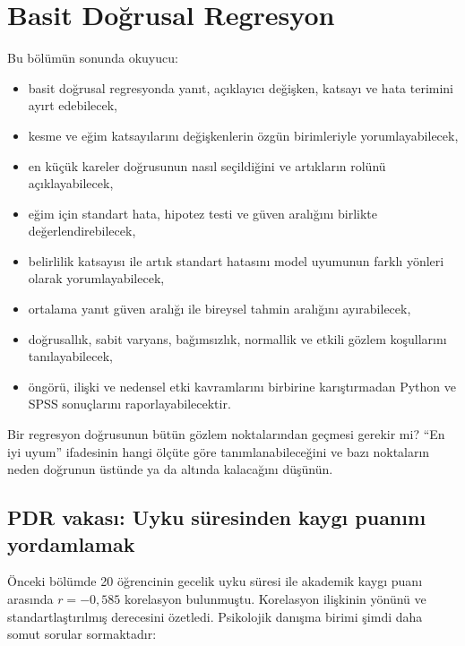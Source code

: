 \chapter{Basit Doğrusal Regresyon}

\begin{hedefler}
Bu bölümün sonunda okuyucu:
\begin{itemize}
  \item basit doğrusal regresyonda yanıt, açıklayıcı değişken, katsayı ve hata terimini ayırt edebilecek,
  \item kesme ve eğim katsayılarını değişkenlerin özgün birimleriyle yorumlayabilecek,
  \item en küçük kareler doğrusunun nasıl seçildiğini ve artıkların rolünü açıklayabilecek,
  \item eğim için standart hata, hipotez testi ve güven aralığını birlikte değerlendirebilecek,
  \item belirlilik katsayısı ile artık standart hatasını model uyumunun farklı yönleri olarak yorumlayabilecek,
  \item ortalama yanıt güven aralığı ile bireysel tahmin aralığını ayırabilecek,
  \item doğrusallık, sabit varyans, bağımsızlık, normallik ve etkili gözlem koşullarını tanılayabilecek,
  \item öngörü, ilişki ve nedensel etki kavramlarını birbirine karıştırmadan Python ve SPSS sonuçlarını raporlayabilecektir.
\end{itemize}
\end{hedefler}

\begin{hazirlik}
Bir regresyon doğrusunun bütün gözlem noktalarından geçmesi gerekir mi?
``En iyi uyum'' ifadesinin hangi ölçüte göre tanımlanabileceğini ve bazı
noktaların neden doğrunun üstünde ya da altında kalacağını düşünün.
\end{hazirlik}

\section{PDR vakası: Uyku süresinden kaygı puanını yordamlamak}

Önceki bölümde 20 öğrencinin gecelik uyku süresi ile akademik kaygı puanı
arasında $r=-0{,}585$ korelasyon bulunmuştu. Korelasyon ilişkinin yönünü ve
standartlaştırılmış derecesini özetledi. Psikolojik danışma birimi şimdi daha
somut sorular sormaktadır:

